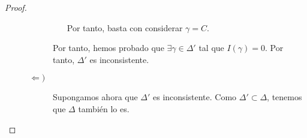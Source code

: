 \documentclass[12pt]{article}
\begin{document}
\begin{ejercicio}
\begin{proof}
\begin{description}
\begin{description}
\begin{itemize}
                        Por tanto, basta con considerar $\gamma=C$.
                    \end{itemize}

                    Por tanto, hemos probado que $\exists \gamma\in \Delta'$ tal que $I(\gamma)=0$. Por tanto, $\Delta'$ es inconsistente.

                    \item[$\Longleftarrow)$] Supongamos ahora que $\Delta'$ es inconsistente. Como $\Delta'\subset \Delta$, tenemos que $\Delta$ también lo es.
                \end{description}
            \end{description}
        \end{proof}
    \end{ejercicio}
\end{document}
